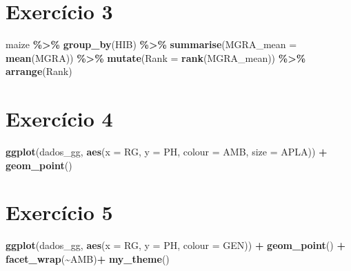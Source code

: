 \documentclass[
]{book}
\newenvironment{Shaded}{\begin{snugshade}}{\end{snugshade}}
\newcommand{\DataTypeTok}[1]{\textcolor[rgb]{0.13,0.29,0.53}{#1}}
\newcommand{\KeywordTok}[1]{\textcolor[rgb]{0.13,0.29,0.53}{\textbf{#1}}}
\newcommand{\NormalTok}[1]{#1}
\newcommand{\OperatorTok}[1]{\textcolor[rgb]{0.81,0.36,0.00}{\textbf{#1}}}
\newcommand{\StringTok}[1]{\textcolor[rgb]{0.31,0.60,0.02}{#1}}
\numberwithin{equation}{section}
\begin{document}
\hypertarget{exerc3}{%
\section{Exercício 3}\label{exerc3}}

\begin{Shaded}
\begin{Highlighting}[]
\NormalTok{maize }\OperatorTok{\%\textgreater{}\%}
\StringTok{  }\KeywordTok{group\_by}\NormalTok{(HIB) }\OperatorTok{\%\textgreater{}\%}
\StringTok{  }\KeywordTok{summarise}\NormalTok{(}\DataTypeTok{MGRA\_mean =} \KeywordTok{mean}\NormalTok{(MGRA)) }\OperatorTok{\%\textgreater{}\%}
\StringTok{  }\KeywordTok{mutate}\NormalTok{(}\DataTypeTok{Rank =} \KeywordTok{rank}\NormalTok{(MGRA\_mean)) }\OperatorTok{\%\textgreater{}\%}
\StringTok{  }\KeywordTok{arrange}\NormalTok{(Rank)}
  
\end{Highlighting}
\end{Shaded}

\hypertarget{exerc4}{%
\section{Exercício 4}\label{exerc4}}

\begin{Shaded}
\begin{Highlighting}[]
\KeywordTok{ggplot}\NormalTok{(dados\_gg, }\KeywordTok{aes}\NormalTok{(}\DataTypeTok{x =}\NormalTok{ RG, }\DataTypeTok{y =}\NormalTok{ PH, }\DataTypeTok{colour =}\NormalTok{ AMB, }\DataTypeTok{size =}\NormalTok{ APLA)) }\OperatorTok{+}
\KeywordTok{geom\_point}\NormalTok{()}
  
\end{Highlighting}
\end{Shaded}

\hypertarget{exerc5}{%
\section{Exercício 5}\label{exerc5}}

\begin{Shaded}
\begin{Highlighting}[]
\KeywordTok{ggplot}\NormalTok{(dados\_gg, }\KeywordTok{aes}\NormalTok{(}\DataTypeTok{x =}\NormalTok{ RG, }\DataTypeTok{y =}\NormalTok{ PH, }\DataTypeTok{colour =}\NormalTok{ GEN)) }\OperatorTok{+}
\StringTok{     }\KeywordTok{geom\_point}\NormalTok{() }\OperatorTok{+}
\StringTok{     }\KeywordTok{facet\_wrap}\NormalTok{(}\OperatorTok{\textasciitilde{}}\NormalTok{AMB)}\OperatorTok{+}
\StringTok{     }\KeywordTok{my\_theme}\NormalTok{()}
  
\end{Highlighting}
\end{Shaded}
\end{document}
